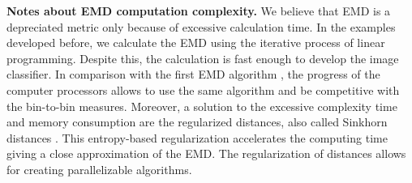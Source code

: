 \textbf{Notes about EMD computation complexity.}
We believe that EMD is a depreciated metric only because of excessive calculation time. In the examples developed before, we calculate the EMD using the iterative process of linear programming. Despite this, the calculation is fast enough to develop the image classifier. In comparison with the first EMD algorithm \citep{Rubner.Tomasi.ea:IJCV:2000}, the progress of the computer processors allows to use the same algorithm and be competitive with the bin-to-bin measures. Moreover, a solution to the excessive complexity time and memory consumption are the regularized distances, also called Sinkhorn distances \citep{Cuturi:NIPS:2013}. This entropy-based regularization accelerates the computing time giving a close approximation of the EMD. The regularization of distances allows for creating parallelizable algorithms. 